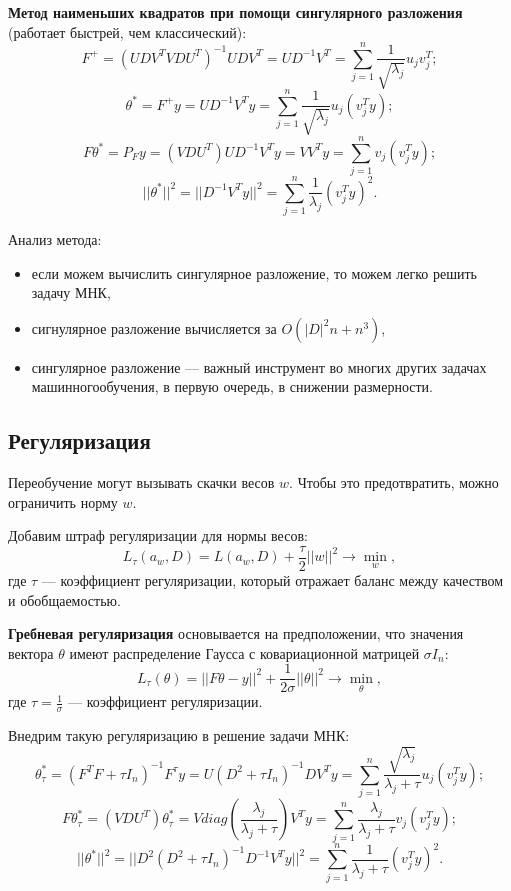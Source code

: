 \textbf{Метод наименьших квадратов при помощи сингулярного разложения} (работает
быстрей, чем классический):
\[
    F^+ = (UDV^TVDU^T)^{-1}UDV^T = UD^{-1}V^T = \sum_{j=1}^n
\frac{1}{\sqrt{\lambda_j}} u_j v_j^T;
\]
\[
    \theta^* = F^+ y = UD^{-1}V^T y = \sum_{j=1}^n \frac{1}{\sqrt{\lambda_j}} 
    u_j (v_j^Ty);
\]
\[
    F\theta^* = P_F y = (VDU^T)UD^{-1}V^T y = VV^T y = \sum_{j=1}^n
    v_j(v_j^Ty);
\]
\[
    ||\theta^*||^2 = ||D^{-1}V^Ty||^2 = \sum_{j=1}^n \frac{1}{\lambda_j} (v_j^T
    y)^2.
\]

Анализ метода:
\begin{itemize}
    \item если можем вычислить сингулярное разложение, то можем легко решить
        задачу МНК,
        
    \item сигнулярное разложение вычисляется за $O(|D|^2n + n^3)$,

    \item сингулярное разложение --- важный инструмент во многих других задачах
        машинногообучения, в первую очередь, в снижении размерности.
\end{itemize}

\subsection{Регуляризация}

Переобучение могут вызывать скачки весов $w$. Чтобы это предотвратить, можно
ограничить норму $w$.

Добавим штраф регуляризации для нормы весов:
\[
    L_{\tau} (a_w, D) = L(a_w, D) + \frac{\tau}{2} ||w||^2 \to \min_w,
\]
где $\tau$ --- коэффициент регуляризации, который отражает баланс между
качеством и обобщаемостью.

\textbf{Гребневая регуляризация} основывается на предположении, что значения
вектора $\theta$ имеют распределение Гаусса с ковариационной матрицей $\sigma I_n$:
\[
    L_{\tau} (\theta) = ||F\theta - y||^2 + \frac{1}{2\sigma} ||\theta||^2 \to
    \min_{\theta},
\]
где $\tau = \frac{1}{\sigma}$ --- коэффициент регуляризации.

Внедрим такую регуляризацию в решение задачи МНК:
\[
    \theta^*_\tau = (F^TF + \tau I_n)^{-1} F^{\tau} y = U(D^2 + \tau I_n)^{-1}
    DV^T y = \sum_{j=1}^n
    \frac{\sqrt{\lambda_j}}{\lambda_j + \tau} u_j (v_j^T y);
\]
\[
    F\theta^*_\tau = (VDU^T)\theta^*_\tau = V diag \left(
    \frac{\lambda_j}{\lambda_j + \tau} \right) V^T y = \sum_{j=1}^n
    \frac{\lambda_j}{\lambda_j + \tau} v_j (v_j^T y);
\]
\[
    ||\theta^*||^2 = ||D^2(D^2 + \tau I_n)^{-1} D^{-1} V^T y||^2 =
    \sum_{j=1}^{n} \frac{1}{\lambda_j + \tau} (v_j^T y)^2.
\]

